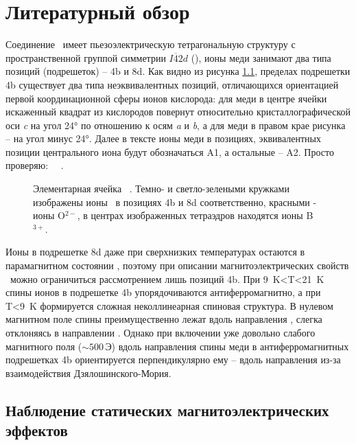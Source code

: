 \chapter{Литературный обзор}\label{ch:ch1}

Соединение \cbo\ имеет пьезоэлектрическую тетрагональную структуру с пространственной группой симметрии \(I\overline{4}2d\) (), ионы меди занимают два типа позиций (подрешеток) – 4b и 8d. Как видно из рисунка \cref{fig:unit-cell}, пределах подрешетки 4b существует два типа неэквивалентных позиций, отличающихся ориентацией первой координационной сферы ионов кислорода: для меди в центре ячейки искаженный квадрат из кислородов повернут относительно кристаллографической оси \emph{c} на угол \ang{24} по отношению к осям \emph{a} и \emph{b}, а для меди в правом крае рисунка -- на угол минус \ang{24}. Далее в тексте ионы меди в позициях, эквивалентных позиции центрального иона будут обозначаться A1, а остальные -- A2. Просто проверяю: \cud\, \niIon\, \nif. 

\begin{figure}[ht]
	\label{fig:unit-cell}
	\caption{Элементарная ячейка \cbo\ \cite{Martinez1971}. Темно- и светло-зелеными кружками изображены ионы \cu\ в позициях 4b и 8d соответственно, красными - ионы O\(^{2-}\), в центрах изображенных тетраэдров находятся ионы B\(^{3+}\). }
\end{figure}

Ионы в подрешетке 8d даже при сверхнизких температурах остаются в парамагнитном состоянии \cite{Boehm2003}, поэтому при описании магнитоэлектрических свойств \cbo\ можно ограничиться рассмотрением лишь позиций 4b. При \SI{9}{\kelvin}<T<\SI{21}{\kelvin} спины ионов в подрешетке 4b  упорядочиваются антиферромагнитно, а при T<\SI{9}{\kelvin} формируется сложная неколлинеарная спиновая структура.  В нулевом магнитном поле спины преимущественно лежат вдоль направления , слегка отклоняясь в направлении  \cite{Boehm2003}. Однако при включении уже довольно слабого магнитного поля (\({\sim}500\,\)Э) вдоль направления  спины меди в антиферромагнитных подрешетках 4b ориентируется перпендикулярно ему – вдоль направления  \cite{Toyoda2019} из-за взаимодействия Дзялошинского-Мория.

\section{Наблюдение статических магнитоэлектрических эффектов}\label{sec:ch1/sec1}

